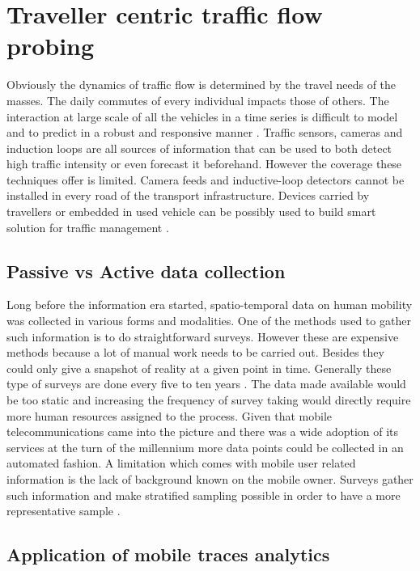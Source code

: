 \documentclass[12pt, a4paper]{report}
\theoremstyle{definition}
\theoremstyle{definition}%
\theoremstyle{definition}%
\theoremstyle{definition}%
\theoremstyle{definition}%
\theoremstyle{definition}%
\begin{document}
\section{Traveller centric traffic flow probing} \label{section:introduction:traveller_centric_traffic_flow_probing}


Obviously the dynamics of traffic flow is determined by the travel needs of the masses. The daily commutes of every individual impacts those of others. The interaction at large scale of all the vehicles in a time series is difficult to model and to predict in a robust and responsive manner \cite{VLAHOGIANNI20143}. Traffic sensors, cameras and induction loops are all sources of information that can be used to both detect high traffic intensity or even forecast it beforehand.  However the coverage these techniques offer is limited. Camera feeds and inductive-loop detectors cannot be installed in every road of the transport infrastructure. Devices carried by travellers or embedded in used vehicle can be possibly used to build smart solution for traffic management \cite{VLAHOGIANNI20143}.


\subsection{Passive vs Active data collection}
Long before the information era started, spatio-temporal data on human mobility was collected in various forms and modalities. One of the methods used to gather such information is to do straightforward surveys\cite{Calabrese2013,Colak2015}. However these are expensive methods because a lot of manual work needs to be carried out. Besides they could only give a snapshot of reality at a given point in time.  Generally these type of surveys are done every five to ten years \cite{Toole2015}. The data made available would be too static and increasing the frequency of survey taking would directly require more human resources assigned to the process. Given that mobile telecommunications came into the picture and there was a wide adoption of its services at the turn of the millennium more data points could be collected in an automated fashion. A limitation which comes with mobile user related information is the lack of background known on the mobile owner. Surveys gather such information and make stratified sampling possible in order to have a more representative sample \cite{Colak2015}.

\subsection{Application of mobile traces analytics} \label{section:introduction:application_mobile_traces}
\end{document}
